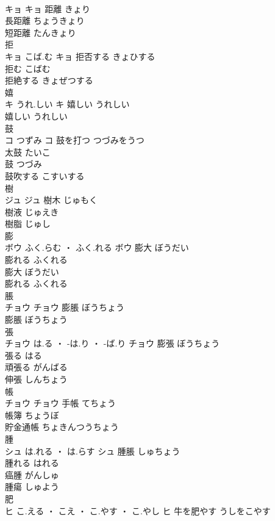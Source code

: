 \documentclass[8pt]{extreport}
\begin{document}
\begin{CJK}{UTF8}{min}
\\	キョ		キョ	距離	きょり	
\\	長距離	ちょうきょり	
\\	短距離	たんきょり	
\\	拒	
\\	キョ	こば.む	キョ	拒否する	きょひする	
\\	拒む	こばむ	
\\	拒絶する	きょぜつする	
\\	嬉	
\\	キ	うれ.しい	キ	嬉しい	うれしい	
\\	嬉しい	うれしい	
\\	鼓	
\\	コ	つずみ	コ	鼓を打つ	つづみをうつ	
\\	太鼓	たいこ	
\\	鼓	つづみ	
\\	鼓吹する	こすいする	
\\	樹	
\\	ジュ		ジュ	樹木	じゅもく	
\\	樹液	じゅえき	
\\	樹脂	じゅし	
\\	膨	
\\	ボウ	ふく.らむ ・ ふく.れる	ボウ	膨大	ぼうだい	
\\	膨れる	ふくれる	
\\	膨大	ぼうだい	
\\	膨れる	ふくれる	
\\	脹	
\\	チョウ		チョウ	膨脹	ぼうちょう	
\\	膨脹	ぼうちょう	
\\	張	
\\	チョウ	は.る ・ -は.り ・ -ば.り	チョウ	膨張	ぼうちょう	
\\	張る	はる	
\\	頑張る	がんばる	
\\	伸張	しんちょう	
\\	帳	
\\	チョウ		チョウ	手帳	てちょう	
\\	帳簿	ちょうぼ	
\\	貯金通帳	ちょきんつうちょう	
\\	腫	
\\	シュ	は.れる ・ は.らす	シュ	腫脹	しゅちょう	
\\	腫れる	はれる	
\\	癌腫	がんしゅ	
\\	腫瘍	しゅよう	
\\	肥	
\\	ヒ	こ.える ・ こえ ・ こ.やす ・ こ.やし	ヒ	牛を肥やす	うしをこやす	

\end{CJK}
\end{document}
